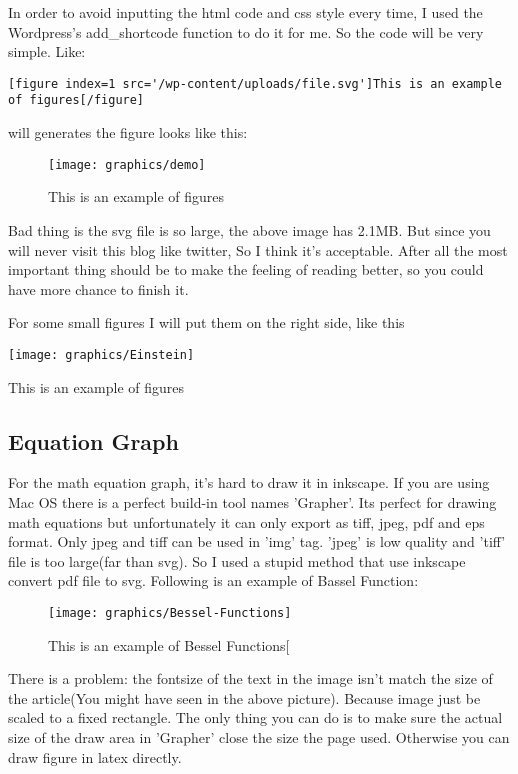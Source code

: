 In order to avoid inputting the html code and css style every time, I used the Wordpress's add\_shortcode function to do it for me. So the code will be very simple. Like:

\begin{lstlisting}[frame=single,breaklines=true]
[figure index=1 src='/wp-content/uploads/file.svg']This is an example of figures[/figure]
\end{lstlisting}

will generates the figure looks like this:

\begin{figure}
	\texttt{[image: graphics/demo]}
	\caption{This is an example of figures}
\end{figure}

Bad thing is the svg file is so large, the above image has 2.1MB. But since you will never visit this blog like twitter, So I think it's acceptable. After all the most important thing should be to make the feeling of reading better, so you could have more chance to finish it.   

For some small figures I will put them on the right side, like this
\begin{marginfigure}
	\texttt{[image: graphics/Einstein]}
	\caption{This is an example of figures}
\end{marginfigure}

\subsection{Equation Graph}

For the math equation graph, it's hard to draw it in inkscape. If you are using Mac OS there is a perfect build-in tool names 'Grapher'. Its perfect for drawing math equations but unfortunately it can only export as tiff, jpeg, pdf and eps format. Only jpeg and tiff can be used in 'img' tag. 'jpeg' is low quality and 'tiff' file is too large(far than svg). So I used a stupid method that use inkscape convert pdf file to svg. Following is an example of Bassel Function:

\begin{figure}
\texttt{[image: graphics/Bessel-Functions]}	
\caption{This is an example of Bessel Functions[}
\end{figure}

There is a problem: the fontsize of the text in the image isn't match the size of the article(You might have seen in the above picture). Because image just be scaled to a fixed rectangle. The only thing you can do is to make sure the actual size of the draw area in 'Grapher' close the size the page used. Otherwise you can draw figure in latex directly.



